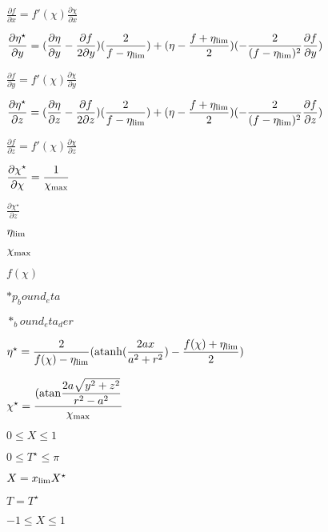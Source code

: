 \documentclass{article}
\begin{document}
$ \displaystyle\frac{\partial f}{\partial x} = f'(\chi) \displaystyle\frac{\partial \chi}{\partial x}$
\pagebreak

$ \displaystyle\frac{\partial \eta^\star}{\partial y } = (\displaystyle\frac{\partial \eta}{\partial y} - \displaystyle\frac{\partial f}{2\partial y}) (\displaystyle\frac{2}{f - \eta_{\rm lim}}) + (\eta - \displaystyle\frac{f+\eta_{\rm lim}}{2}) (-\displaystyle\frac{2}{(f-\eta_{\rm lim})^2} \displaystyle\frac{\partial f}{\partial y}) $
\pagebreak

$ \displaystyle\frac{\partial f}{\partial y} = f'(\chi) \displaystyle\frac{\partial \chi}{\partial y}$
\pagebreak

$ \displaystyle\frac{\partial \eta^\star}{\partial z } = (\displaystyle\frac{\partial \eta}{\partial z} - \displaystyle\frac{\partial f}{2\partial z}) (\displaystyle\frac{2}{f - \eta_{\rm lim}}) + (\eta - \displaystyle\frac{f+\eta_{\rm lim}}{2}) (-\displaystyle\frac{2}{(f-\eta_{\rm lim})^2} \displaystyle\frac{\partial f}{\partial z}) $
\pagebreak

$ \displaystyle\frac{\partial f}{\partial z} = f'(\chi) \displaystyle\frac{\partial \chi}{\partial z}$
\pagebreak

$ \displaystyle\frac{\partial \chi^\star}{\partial \chi } = \displaystyle\frac{1}{\chi_{\rm max}} $
\pagebreak

$ \displaystyle\frac{\partial \chi^\star}{\partial z} $
\pagebreak

$ \eta_{\rm lim} $
\pagebreak

$ \chi_{\rm max} $
\pagebreak

$ f(\chi) $
\pagebreak

$ *p_bound_eta $
\pagebreak

$ *_bound_eta_der $
\pagebreak

$ \eta^\star = \displaystyle\frac{2}{f(\chi)-\eta_{\rm lim}} ({\rm atanh}(\displaystyle\frac{2ax}{a^2+r^2}) - \displaystyle\frac{f(\chi)+\eta_{\rm lim}}{2}) $
\pagebreak

$ \chi^\star = \displaystyle\frac{({\rm atan} \displaystyle\frac{2a\sqrt{y^2+z^2}}{r^2-a^2}} {\chi_{\rm max}} $
\pagebreak

$ 0 \leq X \leq 1 $
\pagebreak

$ 0 \leq T^\star \leq \pi $
\pagebreak

$ X = x_{\rm lim} X^\star $
\pagebreak

$ T = T^\star $
\pagebreak

$ -1 \leq X \leq 1 $
\pagebreak
\end{document}
